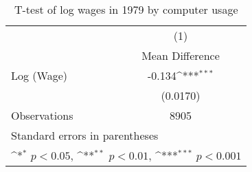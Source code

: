\begin{table}[htbp]\centering
\def\sym#1{\ifmmode^{#1}\else\(^{#1}\)\fi}
\caption{T-test of log wages in 1979 by computer usage\label{1a}}
\begin{tabular}{l*{1}{c}}
\hline\hline
                    &\multicolumn{1}{c}{(1)}\\
                    &\multicolumn{1}{c}{Mean Difference}\\
\hline
Log (Wage)          &      -0.134\sym{***}\\
                    &    (0.0170)         \\
\hline
Observations        &        8905         \\
\hline\hline
\multicolumn{2}{l}{\footnotesize Standard errors in parentheses}\\
\multicolumn{2}{l}{\footnotesize \sym{*} \(p<0.05\), \sym{**} \(p<0.01\), \sym{***} \(p<0.001\)}\\
\end{tabular}
\end{table}
